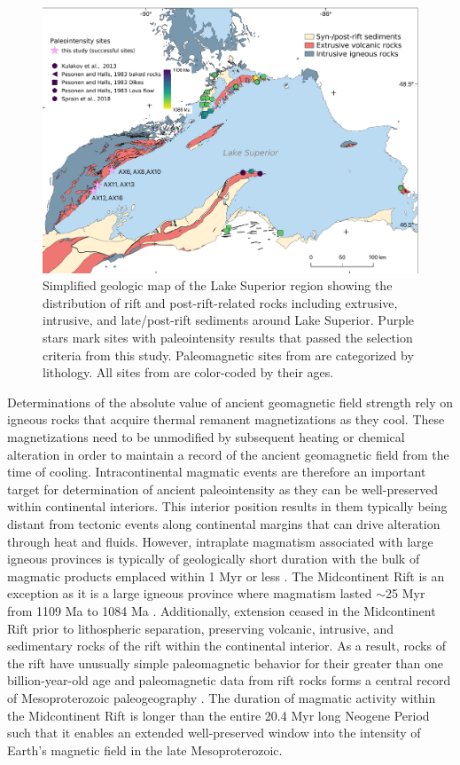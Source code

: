 \documentclass[9pt,twocolumn,twoside,lineno]{pnas-new}
\begin{document}
\begin{figure}
\centering
\noindent\includegraphics[width=11.4 cm]{Geologic_map.pdf}
\caption{\footnotesize{Simplified geologic map of the Lake Superior region showing the distribution of rift and post-rift-related rocks including extrusive, intrusive, and late/post-rift sediments around Lake Superior. Purple stars mark sites with paleointensity results that passed the selection criteria from this study. Paleomagnetic sites from  \citealp{Pesonen1983a} are categorized by lithology. All sites from  \citealp{Pesonen1983a, Kulakov2013a, Sprain2018a} are color-coded by their ages.}}
\label{fig:Geologic_map}
\end{figure}

Determinations of the absolute value of ancient geomagnetic field strength rely on igneous rocks that acquire thermal remanent magnetizations as they cool. These magnetizations need to be unmodified by subsequent heating or chemical alteration in order to maintain a record of the ancient geomagnetic field from the time of cooling. Intracontinental magmatic events are therefore an important target for determination of ancient paleointensity as they can be well-preserved within continental interiors. This interior position results in them typically being distant from tectonic events along continental margins that can drive alteration through heat and fluids. However, intraplate magmatism associated with large igneous provinces is typically of geologically short duration with the bulk of magmatic products emplaced within 1 Myr or less \cite{Kasbohm2021a}. The Midcontinent Rift is an exception as it is a large igneous province where magmatism lasted $\sim$25 Myr from  1109 Ma to 1084 Ma \cite{Swanson-Hysell2019a}. Additionally, extension ceased in the Midcontinent Rift prior to lithospheric separation, preserving volcanic, intrusive, and sedimentary rocks of the rift within the continental interior. As a result, rocks of the rift have unusually simple paleomagnetic behavior for their greater than one billion-year-old age and paleomagnetic data from rift rocks forms a central record of Mesoproterozoic paleogeography \cite{Swanson-Hysell2021c}. The duration of magmatic activity within the Midcontinent Rift is longer than the entire 20.4 Myr long Neogene Period such that it enables an extended well-preserved window into the intensity of Earth's magnetic field in the late Mesoproterozoic. 
\end{document}
